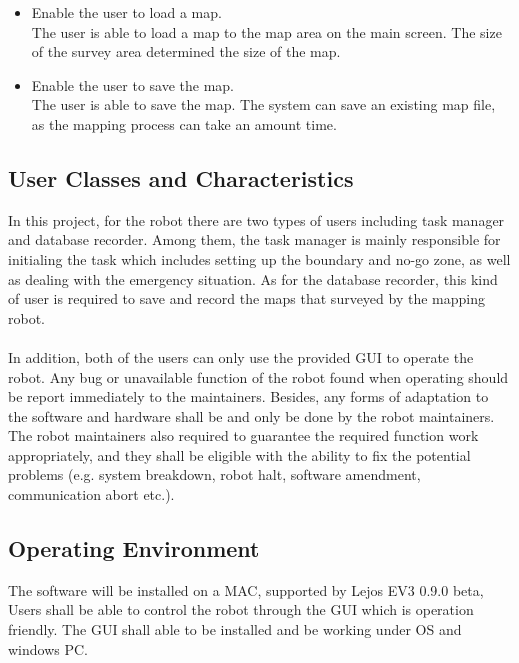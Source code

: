 \documentclass[11pt, a4paper]{article}
\begin{document}
\begin{itemize}
\item Enable the user to load a map.\\
The user is able to load a map to the map area on the main screen. The size of the survey area determined the size of the map.\\

\item Enable the user to save the map.\\
The user is able to save the map. The system can save an existing map file, as the mapping process can take an amount time.\\
\end{itemize}

\subsection{User Classes and Characteristics}
In this project, for the robot there are two types of users including task manager and database recorder. Among them, the task manager is mainly responsible for initialing the task which includes setting up the boundary and no-go zone, as well as dealing with the emergency situation. As for the database recorder, this kind of user is required to save and record the maps that surveyed by the mapping robot.\\
\\
In addition, both of the users can only use the provided GUI to operate the robot. Any bug or unavailable function of the robot found when operating should be report immediately to the maintainers. Besides, any forms of adaptation to the software and hardware shall be and only be done by the robot maintainers. The robot maintainers also required to guarantee the required function work appropriately, and they shall be eligible with the ability to fix the potential problems (e.g. system breakdown, robot halt, software amendment, communication abort etc.). 

\subsection{Operating Environment}
The software will be installed on a MAC, supported by Lejos EV3 0.9.0 beta, Users shall be able to control the robot through the GUI which is operation friendly. The GUI shall able to be installed and be working under OS and windows PC.
\end{document}
